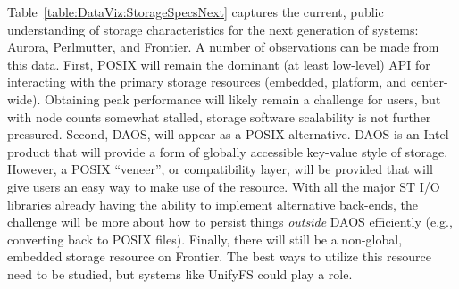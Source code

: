 Table~\ref{table:DataViz:StorageSpecsNext} captures the current, public
understanding of storage characteristics for the next generation of
systems: Aurora, Perlmutter, and Frontier.
%
A number of observations can be made from this data. First, POSIX will
remain the dominant (at least low-level) API for interacting with the primary
storage resources (embedded, platform, and center-wide). Obtaining peak
performance will likely remain a challenge for users, but with node counts
somewhat stalled, storage software scalability is not further pressured.
%
Second, DAOS, will appear as a POSIX alternative. DAOS is an Intel
product that will provide a form of globally accessible key-value
style of storage. However, a POSIX ``veneer'', or compatibility layer,
will be provided that will give users an easy way to make use of the
resource. With all the major ST I/O libraries already having the ability
to implement alternative back-ends, 
the challenge will be more about how to persist things \emph{outside} DAOS efficiently (e.g., converting back
to POSIX files).
%
Finally, there will still be a non-global, embedded storage resource on
Frontier. The best ways to utilize this resource need to be studied, but systems
like UnifyFS could play a role.

